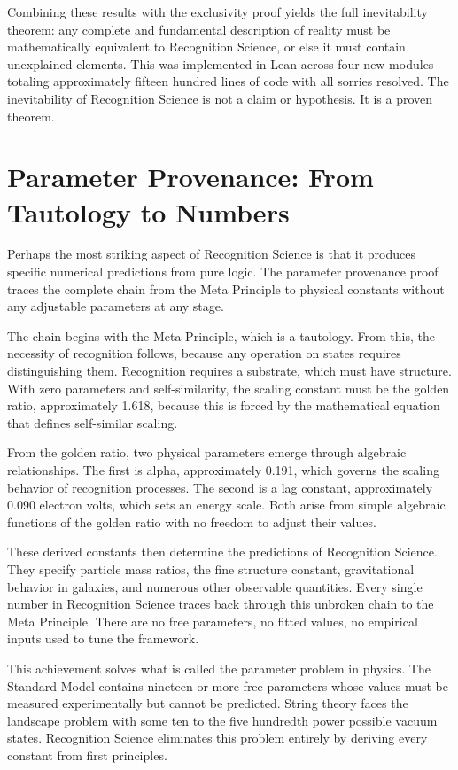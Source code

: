 \documentclass[12pt]{article}
\begin{document}
Combining these results with the exclusivity proof yields the full inevitability theorem: any complete and fundamental description of reality must be mathematically equivalent to Recognition Science, or else it must contain unexplained elements. This was implemented in Lean across four new modules totaling approximately fifteen hundred lines of code with all sorries resolved. The inevitability of Recognition Science is not a claim or hypothesis. It is a proven theorem.

\section{Parameter Provenance: From Tautology to Numbers}

Perhaps the most striking aspect of Recognition Science is that it produces specific numerical predictions from pure logic. The parameter provenance proof traces the complete chain from the Meta Principle to physical constants without any adjustable parameters at any stage.

The chain begins with the Meta Principle, which is a tautology. From this, the necessity of recognition follows, because any operation on states requires distinguishing them. Recognition requires a substrate, which must have structure. With zero parameters and self-similarity, the scaling constant must be the golden ratio, approximately 1.618, because this is forced by the mathematical equation that defines self-similar scaling.

From the golden ratio, two physical parameters emerge through algebraic relationships. The first is alpha, approximately 0.191, which governs the scaling behavior of recognition processes. The second is a lag constant, approximately 0.090 electron volts, which sets an energy scale. Both arise from simple algebraic functions of the golden ratio with no freedom to adjust their values.

These derived constants then determine the predictions of Recognition Science. They specify particle mass ratios, the fine structure constant, gravitational behavior in galaxies, and numerous other observable quantities. Every single number in Recognition Science traces back through this unbroken chain to the Meta Principle. There are no free parameters, no fitted values, no empirical inputs used to tune the framework.

This achievement solves what is called the parameter problem in physics. The Standard Model contains nineteen or more free parameters whose values must be measured experimentally but cannot be predicted. String theory faces the landscape problem with some ten to the five hundredth power possible vacuum states. Recognition Science eliminates this problem entirely by deriving every constant from first principles.
\end{document}
